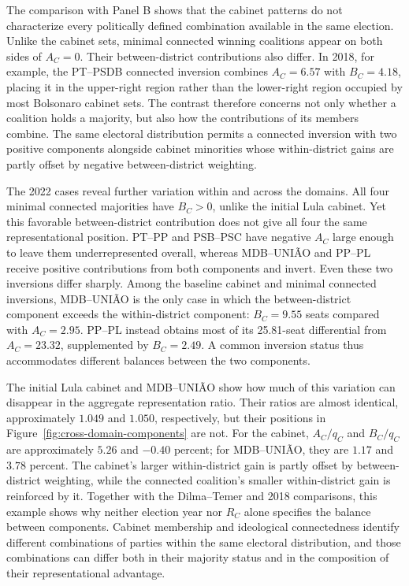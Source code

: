 \documentclass[11pt]{article}
\begin{document}
The comparison with Panel B shows that the cabinet patterns do not
characterize every politically defined combination available in the
same election. Unlike the cabinet sets, minimal connected winning
coalitions appear on both sides of \(A_C=0\). Their between-district
contributions also differ. In 2018, for example, the PT--PSDB connected
inversion combines \(A_C=6.57\) with \(B_C=4.18\), placing it in the
upper-right region rather than the lower-right region occupied by most
Bolsonaro cabinet sets. The contrast therefore concerns not only
whether a coalition holds a majority, but also how the contributions
of its members combine. The same electoral distribution permits a
connected inversion with two positive components alongside cabinet
minorities whose within-district gains are partly offset by negative
between-district weighting.

The 2022 cases reveal further variation within and across the domains.
All four minimal connected majorities have \(B_C>0\), unlike the
initial Lula cabinet. Yet this favorable between-district contribution
does not give all four the same representational position. PT--PP and
PSB--PSC have negative \(A_C\) large enough to leave them
underrepresented overall, whereas MDB--UNIÃO and PP--PL receive
positive contributions from both components and invert. Even these
two inversions differ sharply. Among the baseline cabinet and minimal
connected inversions, MDB--UNIÃO is the only case in which the
between-district component exceeds the within-district component:
\(B_C=9.55\) seats compared with \(A_C=2.95\). PP--PL instead obtains
most of its 25.81-seat differential from \(A_C=23.32\), supplemented
by \(B_C=2.49\). A common inversion status thus accommodates different
balances between the two components.

The initial Lula cabinet and MDB--UNIÃO show how much of this variation
can disappear in the aggregate representation ratio. Their ratios are
almost identical, approximately \(1.049\) and \(1.050\), respectively,
but their positions in Figure~\ref{fig:cross-domain-components} are not.
For the cabinet, \(A_C/q_C\) and \(B_C/q_C\) are approximately
\(5.26\) and \(-0.40\) percent; for MDB--UNIÃO, they are \(1.17\)
and \(3.78\) percent. The cabinet's larger within-district gain is
partly offset by between-district weighting, while the connected
coalition's smaller within-district gain is reinforced by it.
Together with the Dilma--Temer and 2018 comparisons, this example
shows why neither election year nor \(R_C\) alone specifies the
balance between components. Cabinet membership and ideological
connectedness identify different combinations of parties within the
same electoral distribution, and those combinations can differ both
in their majority status and in the composition of their
representational advantage.
\end{document}
